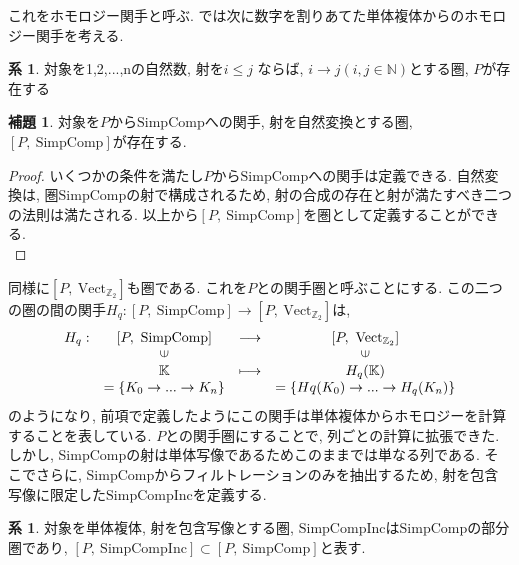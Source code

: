 \documentclass[a4paper]{jsarticle}
\theoremstyle{definition}
\newtheorem{lem}[dfn]{補題}
\newtheorem{cor}[dfn]{系}
\newcommand{\SimpComp}{{\mathrm{SimpComp}}}
\newcommand{\Fun}[2]{[#1,~#2]}
\newcommand{\Vect}{{\mathrm{Vect}}}
\newcommand{\SimpCompInc}{{\mathrm{SimpCompInc}}}
\begin{document}
これをホモロジー関手と呼ぶ. では次に数字を割りあてた単体複体からのホモロジー関手を考える.
\begin{cor}
    対象を1,2,...,nの自然数, 射を$i \leq j$ ならば,  $i\rightarrow j(i, j \in \mathbb{N})$とする圏, $P$が存在する
\end{cor} 
\begin{lem}
    対象を$P$から$\SimpComp$への関手, 射を自然変換とする圏, $\Fun{P}{\SimpComp}$が存在する.
\end{lem}
\begin{proof}
    いくつかの条件を満たし$P$から$\SimpComp$への関手は定義できる. 自然変換は, 圏$\SimpComp$の射で構成されるため, 射の合成の存在と射が満たすべき二つの法則は満たされる. 以上から$\Fun{P}{\SimpComp}$を圏として定義することができる.\\
\end{proof}
同様に$\Fun{P}{\Vect_{\mathbb{Z}_2}}$も圏である. これを$P$との関手圏と呼ぶことにする. この二つの圏の間の関手$H_q:\Fun{P}{\SimpComp}\rightarrow \Fun{P}{\Vect_{\mathbb{Z}_2}}$は,
\begin{equation}
    \begin{array}{cccc}
         H_q:& \Fun{P}{\SimpComp} & \longrightarrow & \Fun{P}{\Vect_{\mathbb{Z}_2}} \\
        & \rotatebox{90}{$\in$} & & \rotatebox{90}{$\in$} \\
        & \mathbb{K}& \longmapsto & H_q(\mathbb{K})\\
         & =\{K_0\rightarrow ...\rightarrow K_n\} &  & =\{Hq(K_0)\rightarrow ...\rightarrow H_q(K_n)\}\\
    \end{array}
\end{equation}
のようになり, 前項で定義したようにこの関手は単体複体からホモロジーを計算することを表している. $P$との関手圏にすることで, 列ごとの計算に拡張できた. しかし, SimpCompの射は単体写像であるためこのままでは単なる列である. 
そこでさらに, $\SimpComp$からフィルトレーションのみを抽出するため, 射を包含写像に限定した$\SimpCompInc$を定義する. 
\begin{cor}
    対象を単体複体, 射を包含写像とする圏, $\SimpCompInc$は$\SimpComp$の部分圏であり, $\Fun{P}{\SimpCompInc}\subset \Fun{P}{\SimpComp}$と表す.
\end{cor}
\end{document}
